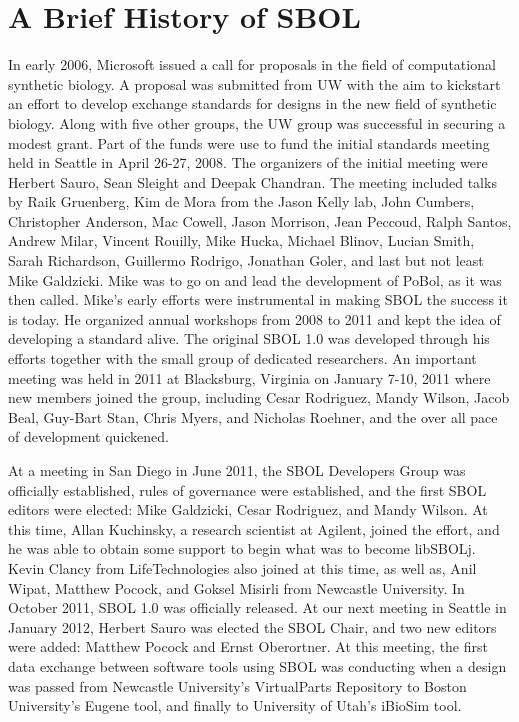\section{A Brief History of SBOL}

In early 2006, Microsoft issued a call for proposals in the field of computational synthetic biology. A proposal was submitted from UW with the aim to kickstart an effort to develop exchange standards for designs in the new field of synthetic biology. Along with five other groups, the UW group was successful in securing a modest grant. Part of the funds were use to fund the initial standards meeting held in Seattle in April 26-27, 2008. The organizers of the initial meeting were Herbert Sauro, Sean Sleight and Deepak Chandran. The meeting included talks by Raik Gruenberg,  Kim de Mora from the Jason Kelly lab, John Cumbers,  Christopher Anderson, Mac Cowell, Jason Morrison, Jean Peccoud, Ralph Santos, Andrew Milar, Vincent Rouilly, Mike Hucka, Michael Blinov, Lucian Smith, Sarah Richardson, Guillermo Rodrigo, Jonathan Goler, and last but not least Mike Galdzicki. Mike was to go on and lead the development of PoBol, as it was then called. Mike's early efforts were instrumental in making SBOL the success it is today. He organized annual workshops from 2008 to 2011 and kept the idea of developing a standard alive. The original SBOL 1.0 was developed through his efforts together with the small group of dedicated researchers. An important meeting was held in 2011 at Blacksburg, Virginia on January 7-10, 2011 where new members joined the group, including Cesar Rodriguez, Mandy Wilson, Jacob Beal, Guy-Bart Stan, Chris Myers, and Nicholas Roehner, and the over all pace of development quickened. 

At a meeting in San Diego in June 2011, the SBOL Developers Group was officially established, rules of governance were established, and the first SBOL editors were elected: Mike Galdzicki, Cesar Rodriguez, and Mandy Wilson.  At this time, Allan Kuchinsky, a research scientist at Agilent, joined the effort, and he was able to obtain some support to begin what was to become libSBOLj.  Kevin Clancy from LifeTechnologies also joined at this time, as well as, Anil Wipat, Matthew Pocock, and Goksel Misirli from Newcastle University.  In October 2011, SBOL 1.0 was officially released.  At our next meeting in Seattle in January 2012, Herbert Sauro was elected the SBOL Chair, and two new editors were added: Matthew Pocock and Ernst Oberortner.  At this meeting, the first data exchange between software tools using SBOL was conducting when a design was passed from Newcastle University's VirtualParts Repository to Boston University's Eugene tool, and finally to University of Utah's iBioSim tool. 

